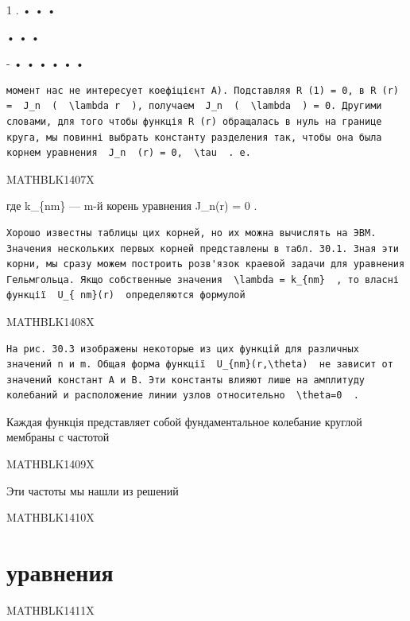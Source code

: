 \documentclass[
  ukrainian,
]{article}
\begin{document}
1 \textbar{} . \textbar{} • \textbar{} \textbar{} • \textbar{}
\textbar{} • \textbar{} \textbar{} \textbar{}

\textbar{} \textbar{} \textbar{} • \textbar{} \textbar{} • \textbar{} •
\textbar{} \textbar{} \textbar{}

- \textbar{} • \textbar{} • \textbar{} • \textbar{} • \textbar{} •
\textbar{} • \textbar{} \textbar{} \textbar{}

\begin{verbatim}
момент нас не интересует коефіцієнт A). Подставляя R (1) = 0, в R (r) =  J_n  (  \lambda r  ), получаем  J_n  (  \lambda  ) = 0. Другими словами, для того чтобы функція R (r) обращалась в нуль на границе круга, мы повинні выбрать константу разделения так, чтобы она была корнем уравнения  J_n  (r) = 0,  \tau  . e.
\end{verbatim}

MATHBLK1407X

где k\_\{nm\} --- m-й корень уравнения J\_n(r) = 0 .

\begin{verbatim}
Хорошо известны таблицы цих корней, но их можна вычислять на ЭВМ. Значения нескольких первых корней представлены в табл. 30.1. Зная эти корни, мы сразу можем построить розв'язок краевой задачи для уравнения Гельмгольца. Якщо собственные значения  \lambda = k_{nm}  , то власні функції  U_{ nm}(r)  определяются формулой
\end{verbatim}

MATHBLK1408X

\begin{verbatim}
На рис. 30.3 изображены некоторые из цих функцій для различных значений n и m. Общая форма функції  U_{nm}(r,\theta)  не зависит от значений констант A и B. Эти константы влияют лише на амплитуду колебаний и расположение линии узлов относительно  \theta=0  .
\end{verbatim}

Каждая функція представляет собой фундаментальное колебание круглой
мембраны с частотой

MATHBLK1409X

Эти частоты мы нашли из решений

MATHBLK1410X

\section{уравнения}\label{ux443ux440ux430ux432ux43dux435ux43dux438ux44f}

MATHBLK1411X
\end{document}
